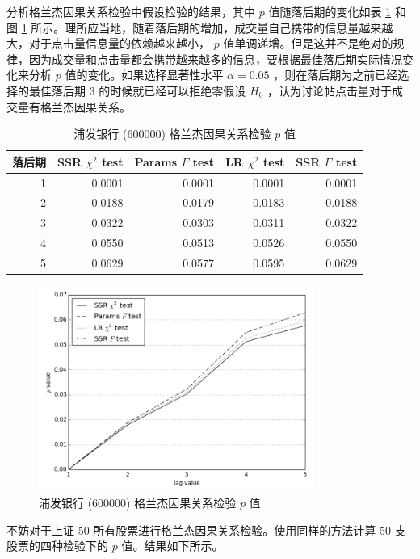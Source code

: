 分析格兰杰因果关系检验中假设检验的结果，其中 $p$ 值随落后期的变化如表 \ref{f_test:10} 和图 \ref{f_test:11} 所示。理所应当地，随着落后期的增加，成交量自己携带的信息量越来越大，对于点击量信息量的依赖越来越小， $p$ 值单调递增。但是这并不是绝对的规律，因为成交量和点击量都会携带越来越多的信息，要根据最佳落后期实际情况变化来分析 $p$ 值的变化。如果选择显著性水平 $\alpha=0.05$ ，则在落后期为之前已经选择的最佳落后期 $3$ 的时候就已经可以拒绝零假设 $H_{0}$ ，认为讨论帖点击量对于成交量有格兰杰因果关系。

\begin{table}
  \centering
  \caption{浦发银行 (600000) 格兰杰因果关系检验 $p$ 值}
  \label{f_test:10}
  \begin{tabular}{rrrrr}
    \toprule
    落后期 & SSR $\chi^{2}$ test & Params $F$ test & LR $\chi^{2}$ test & SSR $F$ test \\
    \midrule
    1 & 0.0001 & 0.0001 & 0.0001 & 0.0001 \\
    2 & 0.0188 & 0.0179 & 0.0183 & 0.0188 \\
    3 & 0.0322 & 0.0303 & 0.0311 & 0.0322 \\
    4 & 0.0550 & 0.0513 & 0.0526 & 0.0550 \\
    5 & 0.0629 & 0.0577 & 0.0595 & 0.0629 \\
    \bottomrule
  \end{tabular}
\end{table}

\begin{figure}
  \centering
  \includegraphics[width=0.8\textwidth]{plots/granger_causality_test_1.png}
  \caption{浦发银行 (600000) 格兰杰因果关系检验 $p$ 值}
  \label{f_test:11}
\end{figure}

不妨对于上证 50 所有股票进行格兰杰因果关系检验。使用同样的方法计算 50 支股票的四种检验下的 $p$ 值。结果如下所示。

